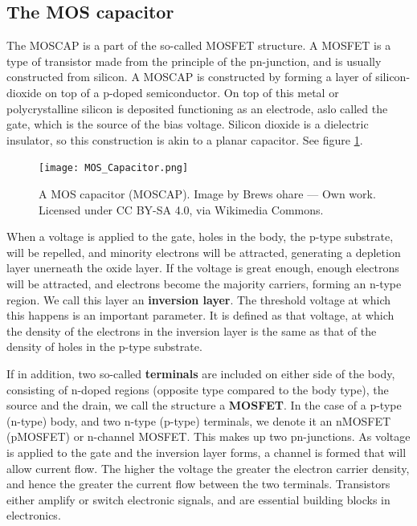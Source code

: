 \documentclass[../main.tex]{subfiles}
\begin{document}
	\subsection{The MOS capacitor}
	The MOSCAP is a part of the so-called MOSFET structure. A MOSFET is a type of transistor made from the principle of the pn-junction, and is usually constructed from silicon. A MOSCAP is constructed by forming a layer of silicon-dioxide on top of a p-doped semiconductor. On top of this metal or polycrystalline silicon is deposited functioning as an electrode, aslo called the gate, which is the source of the bias voltage. Silicon dioxide is a dielectric insulator, so this construction is akin to a planar capacitor. See figure \ref{fig:mosfet}.
	
	\begin{figure}[h!]
		\centering
		\texttt{[image: MOS\_Capacitor.png]}
		\caption{A MOS capacitor (MOSCAP). Image by Brews ohare — Own work. Licensed under CC BY-SA 4.0, via Wikimedia Commons.
		}
		\label{fig:mosfet}
	\end{figure}
	When a voltage is applied to the gate, holes in the body, the p-type substrate, will be repelled, and minority electrons will be attracted, generating a depletion layer unerneath the oxide layer. If the voltage is great enough, enough electrons will be attracted, and electrons become the majority carriers, forming an n-type region. We call this layer an \textbf{inversion layer}. The threshold voltage at which this happens is an important parameter. It is defined as that voltage, at which the density of the electrons in the inversion layer is the same as that of the density of holes in the p-type substrate. 
	
	If in addition, two so-called \textbf{terminals} are included on either side of the body, consisting of n-doped regions (opposite type compared to the body type), the source and the drain, we call the structure a \textbf{MOSFET}. In the case of a p-type (n-type) body, and two n-type (p-type) terminals, we denote it an nMOSFET (pMOSFET)  or n-channel MOSFET. This makes up two pn-junctions. As voltage is applied to the gate and the inversion layer forms, a channel is formed that will allow current flow. The higher the voltage the greater the electron carrier density, and hence the greater the current flow between the two terminals. Transistors either amplify or switch electronic signals, and are essential building blocks in electronics. 
	
\end{document}
